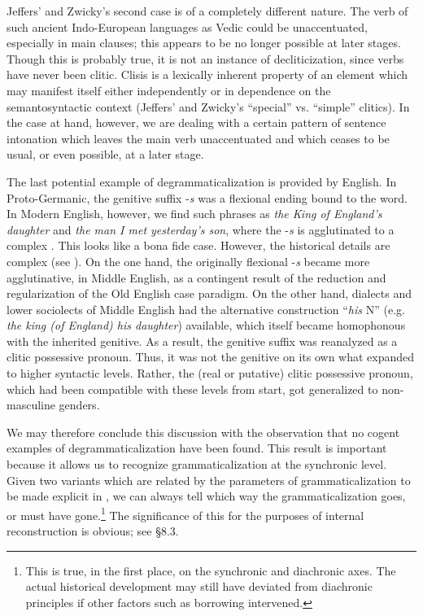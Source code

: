 Jeffers' and Zwicky's second case is of a completely different nature. The verb of such ancient Indo-European languages as Vedic could be unaccentuated, especially in main clauses; this appears to be no longer possible at later stages. Though this is probably true, it is not an instance of decliticization, since verbs have never been clitic. Clisis is a lexically inherent property of an element which may manifest itself either independently or in dependence on the semantosyntactic context (Jeffers' and Zwicky's “special” vs. “simple” clitics). In the case at hand, however, we are dealing with a certain pattern of sentence intonation which leaves the main verb unaccentuated and which ceases to be usual, or even possible, at a later stage.

The last potential example of degrammaticalization is provided by English. In Proto-Germanic, the genitive suffix -\textit{s} was a flexional ending bound to the word. In Modern English, however, we find such phrases as \textit{the King of England's daughter} and \textit{the man I met yesterday's son}, where the -\textit{s} is agglutinated to a complex \np. This looks like a bona fide case. However, the historical details are complex (see \citealt{Janda1980}). On the one hand, the originally flexional -\textit{s} became more agglutinative, in Middle English, as a contingent result of the reduction and regularization of the Old English case paradigm. On the other hand, dialects and lower sociolects of Middle English had the alternative construction ``\np \textit{his} N'' (e.g. \textit{the king (of England) his daughter}) available, which itself became homophonous with the inherited genitive. As a result, the genitive suffix was reanalyzed as a clitic possessive pronoun. Thus, it was not the genitive on its own what expanded to higher syntactic levels. Rather, the (real or putative) clitic possessive pronoun, which had been compatible with these levels from start, got generalized to non-masculine genders.

We may therefore conclude this discussion with the observation that no cogent examples of degrammaticalization have been found. This result is important because it allows us to recognize grammaticalization at the synchronic level. Given two variants which are related by the parameters of grammaticalization to be made explicit in , we can always tell which way the grammaticalization goes, or must have gone.\footnote{This is true, in the first place, on the synchronic and diachronic axes. The actual historical development may still have deviated from diachronic principles if other factors such as borrowing intervened.} The significance of this for the purposes of internal reconstruction is obvious; see §8.3.

